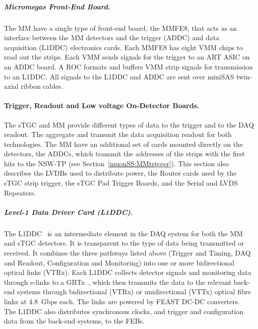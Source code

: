 \documentclass[cernpreprint, atlasdraft=false, UKenglish,british,orcidlogo, texmf, orcidlogo]{atlasdoc}
\begin{document}
\subparagraph{Micromegas Front-End Board. \label{MuSP:MMFE}}
The \gls{MM} have a single type of front-end board, the \gls{MMFE8}, that acts as an interface between the \gls{MM} detectors and the trigger (\gls{ADDC}) and data acquisition (\gls{L1DDC}) electronics cards.
Each \gls{MMFE8} has eight \gls{VMM} chips to read out the strips.
Each \gls{VMM} sends signals for the trigger to an \gls{ART} \gls{ASIC} on an \gls{ADDC} board.
A \gls{ROC} formats and buffers \gls{VMM} strip signals for transmission to an \gls{L1DDC}.
All signals to the \gls{L1DDC} and \gls{ADDC} are sent over miniSAS twin-axial ribbon cables.
 
 
\paragraph{Trigger, Readout and Low voltage On-Detector Boards.}
The \gls{sTGC} and \gls{MM} provide different types of data to the trigger and to the \gls{DAQ} readout.
The  aggregate and transmit the data acquisition readout for both technologies.
The \gls{MM} have an additional set of cards mounted directly on the detectors, the \glspl{ADDC}, which transmit the addresses of the strips with the first hits to the \gls{NSW-TP} (see Section~\ref{muonSS:MMtrigger}).
This section also describes the \glspl{LVDB} used to distribute power, the Router cards used by the \gls{sTGC} strip trigger, the \gls{sTGC} Pad Trigger Boards, and the Serial and \gls{LVDS} Repeaters.
 
\subparagraph{Level-1 Data Driver Card (L1DDC). \label{MuSP:L1DDC}}
The \gls{L1DDC}~\cite{Gkountoumis:2018usk} is an intermediate element in the \gls{DAQ} system for both the \gls{MM} and \gls{sTGC} detectors.
It is transparent to the type of data being transmitted or received.
It combines the three pathways listed above (Trigger and Timing, \gls{DAQ} and Readout, Configuration and Monitoring) into one or more bidirectional optical links (\gls{VTRx}).
Each \gls{L1DDC} collects detector signals and monitoring data through \glspl{e-link} to a \gls{GBTx}~\cite{GBT}, which then transmits the data to the relevant back-end systems through bidirectional (\gls{VTRx}) or unidirectional (\gls{VTTx}) optical fibre links at \SI{4.8}{Gbps} each.
The links are powered by \gls{FEAST} DC-DC converters.
The \gls{L1DDC} also distributes synchronous clocks, and trigger and configuration data from the back-end systems, to the \glspl{FEB}.
 
\end{document}
